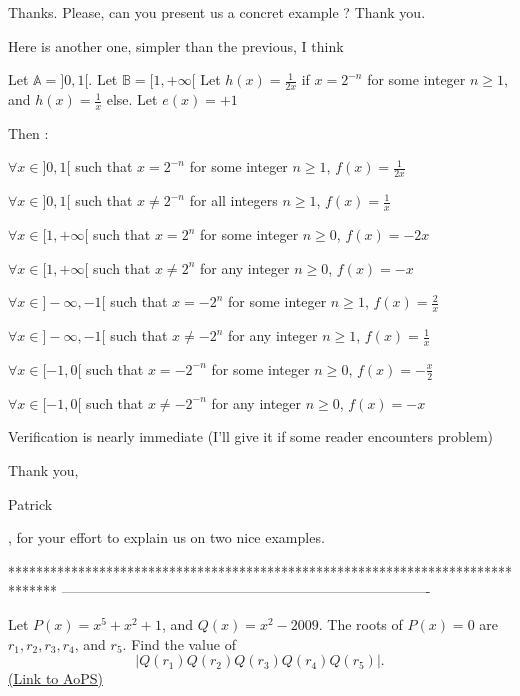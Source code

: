 \begin{solution}
	\begin{tcolorbox}Thanks. Please, can you present us a concret example ? Thank you.\end{tcolorbox}

Here is another one, simpler than the previous, I think

Let $ \mathbb{A}=]0,1[$.
Let $ \mathbb{B}=[1,+\infty[$
Let $ h(x)=\frac{1}{2x}$ if $ x=2^{-n}$ for some integer $ n\geq 1$, and $ h(x)=\frac{1}{x}$ else.
Let $ e(x)=+1$

Then :

$ \forall x\in]0,1[$ such that $ x=2^{-n}$ for some integer $ n\geq 1$, $ f(x)=\frac{1}{2x}$

$ \forall x\in]0,1[$ such that $ x\neq 2^{-n}$ for all integers $ n\geq 1$, $ f(x)=\frac{1}{x}$

$ \forall x\in[1,+\infty[$ such that $ x=2^n$ for some integer $ n\geq 0$, $ f(x)=-2x$

$ \forall x\in[1,+\infty[$ such that $ x\neq 2^n$ for any integer $ n\geq 0$, $ f(x)=-x$

$ \forall x\in]-\infty,-1[$ such that $ x=-2^n$ for some integer $ n\geq 1$, $ f(x)=\frac{2}{x}$

$ \forall x\in]-\infty,-1[$ such that $ x\neq -2^n$ for any integer $ n\geq 1$, $ f(x)=\frac{1}{x}$

$ \forall x\in[-1,0[$ such that $ x=-2^{-n}$ for some integer $ n\geq 0$, $ f(x)=-\frac{x}{2}$

$ \forall x\in[-1,0[$ such that $ x\neq -2^{-n}$ for any integer $ n\geq 0$, $ f(x)=-x$

Verification is nearly immediate (I'll give it if some reader encounters problem)
\end{solution}



\begin{solution}
	Thank you, \begin{bolded}Patrick\end{bolded}, for your effort to explain us on two nice examples.
\end{solution}
*******************************************************************************
-------------------------------------------------------------------------------

\begin{problem}
	Let $P(x)= x^5+x^2+1$, and $Q(x)= x^2-2009$. The roots of $P(x)=0$ are $r_1, r_2, r_3, r_4$, and $r_5$. Find the value of \[|Q(r_1)Q(r_2)Q(r_3)Q(r_4)Q(r_5)|.\]
	\flushright \href{https://artofproblemsolving.com/community/c6h272959}{(Link to AoPS)}
\end{problem}



